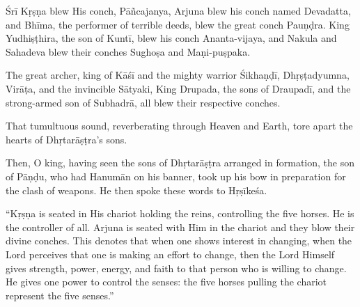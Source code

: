 {Śrī Kṛṣṇa blew His conch, Pāñcajanya, Arjuna blew his conch named Devadatta, and Bhīma, the performer of terrible deeds, blew the great conch Pauṇḍra. King Yudhiṣṭhira, the son of Kuntī, blew his conch Ananta-vijaya, and Nakula and Sahadeva blew their conches Sughoṣa and Maṇi-puṣpaka.}

{The great archer, king of Kāśī and the mighty warrior Śikhaṇḍī, Dhṛṣṭadyumna, Virāṭa, and the invincible Sātyaki, King Drupada, the sons of Draupadī, and the strong-armed son of Subhadrā, all blew their respective conches.}

{That tumultuous sound, reverberating through Heaven and Earth, tore apart the hearts of Dhṛtarāṣṭra’s sons.}

{Then, O king, having seen the sons of Dhṛtarāṣṭra arranged in formation, the son of Pāṇḍu, who had Hanumān on his banner, took up his bow in preparation for the clash of weapons. He then spoke these words to Hṛṣīkeśa.}


\enquote{Kṛṣṇa is seated in His chariot holding the reins, controlling the five horses. He is the controller of all. Arjuna is seated with Him in the chariot and they blow their divine conches. This denotes that when one shows interest in changing, when the Lord perceives that one is making an effort to change, then the Lord Himself gives strength, power, energy, and faith to that person who is willing to change. He gives one power to control the senses: the five horses pulling the chariot represent the five senses.}

